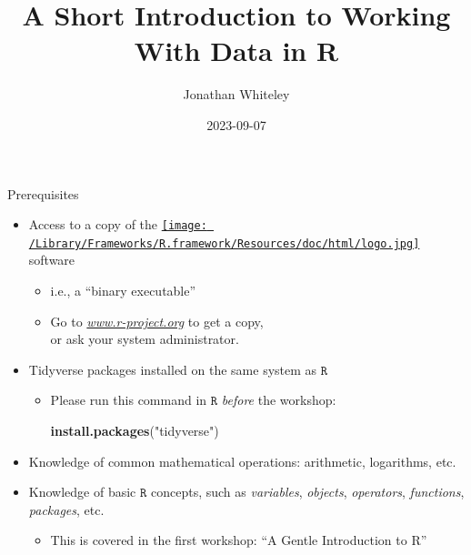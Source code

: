 \documentclass[
  11pt,
  ignorenonframetext,
]{beamer}
\title{A Short Introduction to Working With Data in R}
\author{Jonathan Whiteley}
\date{2023-09-07}
\newenvironment{Shaded}{\begin{snugshade}}{\end{snugshade}}
\newcommand{\FunctionTok}[1]{\textcolor[rgb]{0.13,0.29,0.53}{\textbf{#1}}}
\newcommand{\NormalTok}[1]{#1}
\newcommand{\StringTok}[1]{\textcolor[rgb]{0.31,0.60,0.02}{#1}}
\providecommand{\tightlist}{%
  \setlength{\itemsep}{0pt}\setlength{\parskip}{0pt}}
\newcommand{\R}{\texttt{R}}
\begin{document}
\frame{\titlepage}

\begin{frame}[fragile]{Prerequisites}
\protect\hypertarget{prerequisites}{}
\begin{itemize}
\item
  Access to a copy of the
  \href{https://www.r-project.org}{\texttt{[image: /Library/Frameworks/R.framework/Resources/doc/html/logo.jpg]}}
  software

  \begin{itemize}
  \item
    i.e., a ``binary executable''
  \item
    Go to \href{https://www.r-project.org}{\emph{www.r-project.org}} to
    get a copy,\\
    or ask your system administrator.
  \end{itemize}
\item
  Tidyverse packages installed on the same system as \(\R\)

  \begin{itemize}
  \item
    Please run this command in \(\R\) \emph{before} the workshop:

\begin{Shaded}
\begin{Highlighting}[]
\FunctionTok{install.packages}\NormalTok{(}\StringTok{"tidyverse"}\NormalTok{)}
\end{Highlighting}
\end{Shaded}
  \end{itemize}
\item
  Knowledge of common mathematical operations: arithmetic, logarithms,
  etc.
\item
  Knowledge of basic \(\R\) concepts, such as \emph{variables},
  \emph{objects}, \emph{operators}, \emph{functions}, \emph{packages},
  etc.

  \begin{itemize}
  \tightlist
  \item
    This is covered in the first workshop: ``A Gentle Introduction to
    R''
  \end{itemize}
\end{itemize}
\end{frame}
\end{document}
